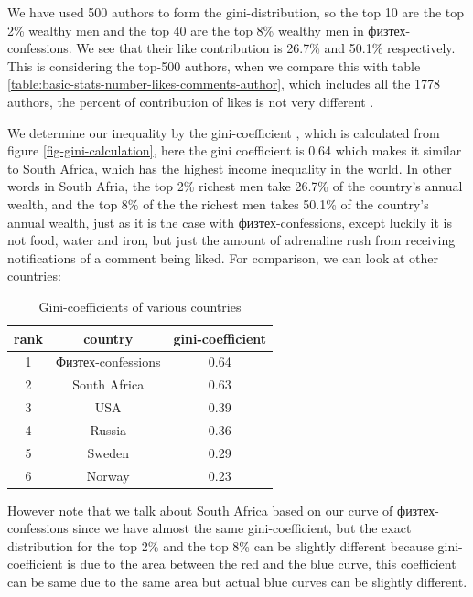 \documentclass[
	11pt
] {article}
\begin{document}
	We have used 500 authors to form the gini-distribution, so the top 10 are the top \num{2}\% wealthy men and the top 40 are the top \num{8}\% wealthy men in физтех-confessions. We see that their like contribution is \num{26.7}\% and \num{50.1}\% respectively. This is considering the top-500 authors, when we compare this with table \ref{table:basic-stats-number-likes-comments-author}, which includes all the \num{1778} authors, the percent of contribution of likes is not very different \cite{sheet-calc-gini-coefficient}.

	We determine our inequality by the gini-coefficient \cite{wikipedia-gini}, which is calculated from figure \ref{fig-gini-calculation}, here the gini coefficient is \num{0.64} which makes it similar to South Africa, which has the highest income inequality in the world. In other words in South Afria, the top \num{2}\% richest men take \num{26.7}\% of the country's annual wealth, and the top \num{8}\% of the the richest men takes \num{50.1}\% of the country's annual wealth, just as it is the case with физтех-confessions, except luckily it is not food, water and iron, but just the amount of adrenaline rush from receiving notifications of a comment being liked. For comparison, we can look at other countries:
	\begin{table}[H]
		\centering
		\caption{Gini-coefficients of various countries}
		\label{table:gini-countries}
		\begin{tabular}{| c | c | c |} %
			\hline
			rank & country & gini-coefficient \\
			\hline
			1 & Физтех-confessions & \num{0.64} \\
			2 & South Africa & \num{0.63} \\
			3 & USA & \num{0.39} \\
			4 & Russia & \num{0.36} \\
			5 & Sweden & \num{0.29} \\
			6 & Norway & \num{0.23} \\
			\hline
		\end{tabular}
	\end{table}

	However note that we talk about South Africa based on our curve of физтех-confessions since we have almost the same gini-coefficient, but the exact distribution for the top \num{2}\% and the top \num{8}\% can be slightly different because gini-coefficient is due to the area between the red and the blue curve, this coefficient can be same due to the same area but actual blue curves can be slightly different.
\end{document}
